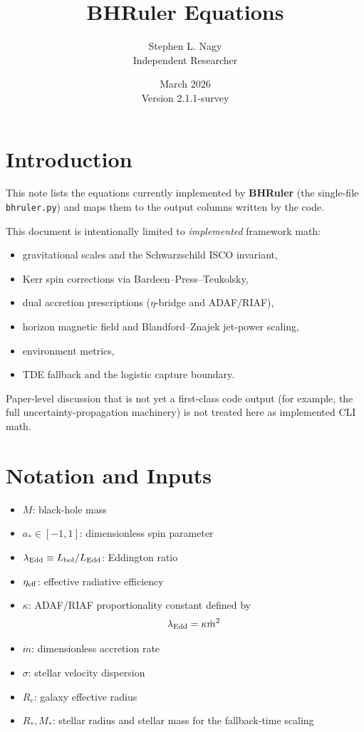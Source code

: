 \documentclass[12pt]{article}
\begin{document}
\title{BHRuler Equations}
\author{Stephen L. Nagy \\ \small{Independent Researcher}}
\date{March 2026 \\ Version 2.1.1-survey}
\maketitle

\section*{Introduction}

This note lists the equations currently implemented by \textbf{BHRuler} (the single-file
\texttt{bhruler.py}) and maps them to the output columns written by the code.

This document is intentionally limited to \emph{implemented} framework math:
\begin{itemize}
    \item gravitational scales and the Schwarzschild ISCO invariant,
    \item Kerr spin corrections via Bardeen--Press--Teukolsky,
    \item dual accretion prescriptions ($\eta$-bridge and ADAF/RIAF),
    \item horizon magnetic field and Blandford--Znajek jet-power scaling,
    \item environment metrics,
    \item TDE fallback and the logistic capture boundary.
\end{itemize}

Paper-level discussion that is not yet a first-class code output (for example, the full uncertainty-propagation machinery) is not treated here as implemented CLI math.

\section*{Notation and Inputs}

\begin{itemize}
    \item $M$: black-hole mass
    \item $a_* \in [-1,1]$: dimensionless spin parameter
    \item $\lambda_{\rm Edd} \equiv L_{\rm bol}/L_{\rm Edd}$: Eddington ratio
    \item $\eta_{\rm eff}$: effective radiative efficiency
    \item $\kappa$: ADAF/RIAF proportionality constant defined by
    \[
    \lambda_{\rm Edd} = \kappa \dot m^2
    \]
    \item $\dot m$: dimensionless accretion rate
    \item $\sigma$: stellar velocity dispersion
    \item $R_e$: galaxy effective radius
    \item $R_*, M_*$: stellar radius and stellar mass for the fallback-time scaling
\end{itemize}
\end{document}
